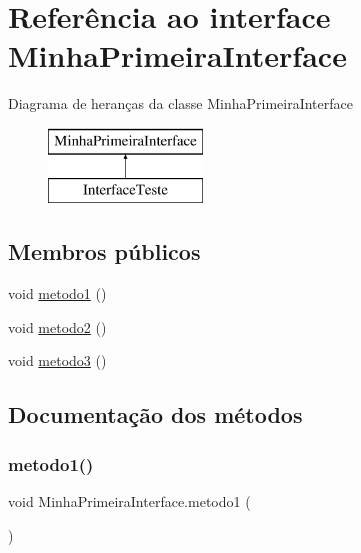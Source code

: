 \hypertarget{interface_minha_primeira_interface}{}\section{Referência ao interface Minha\+Primeira\+Interface}
\label{interface_minha_primeira_interface}
Diagrama de heranças da classe Minha\+Primeira\+Interface\begin{figure}[H]
\begin{center}
\leavevmode
\includegraphics[height=2.000000cm]{interface_minha_primeira_interface}
\end{center}
\end{figure}
\subsection*{Membros públicos}
\begin{DoxyCompactItemize}
\item 
void \hyperlink{interface_minha_primeira_interface_a7790ccc288e3d320de41ec6c179aeed9}{metodo1} ()
\item 
void \hyperlink{interface_minha_primeira_interface_ad8461cbd12b06d9b8991e5c0558dbabb}{metodo2} ()
\item 
void \hyperlink{interface_minha_primeira_interface_a8cc4c146a3231985c6c31eb5c1e5d709}{metodo3} ()
\end{DoxyCompactItemize}


\subsection{Documentação dos métodos}
\hypertarget{interface_minha_primeira_interface_a7790ccc288e3d320de41ec6c179aeed9}{}\label{interface_minha_primeira_interface_a7790ccc288e3d320de41ec6c179aeed9} 
\subsubsection{\texorpdfstring{metodo1()}{metodo1()}}
{\footnotesize\ttfamily void Minha\+Primeira\+Interface.\+metodo1 (\begin{DoxyParamCaption}{ }\end{DoxyParamCaption})}



